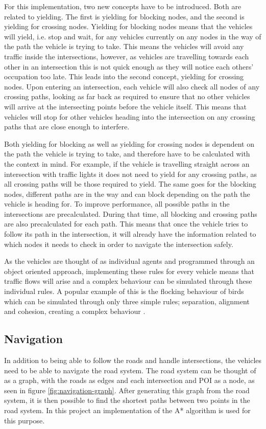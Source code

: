         For this implementation, two new concepts have to be introduced. Both are related to yielding. The first is yielding for blocking nodes, and the second is yielding for crossing nodes. Yielding for blocking nodes means that the vehicles will yield, i.e. stop and wait, for any vehicles currently on any nodes in the way of the path the vehicle is trying to take. This means the vehicles will avoid any traffic inside the intersections, however, as vehicles are travelling towards each other in an intersection this is not quick enough as they will notice each others' occupation too late. This leads into the second concept, yielding for crossing nodes. Upon entering an intersection, each vehicle will also check all nodes of any crossing paths, looking as far back as required to ensure that no other vehicles will arrive at the intersecting points before the vehicle itself. This means that vehicles will stop for other vehicles heading into the intersection on any crossing paths that are close enough to interfere.
    
        Both yielding for blocking as well as yielding for crossing nodes is dependent on the path the vehicle is trying to take, and therefore have to be calculated with the context in mind. For example, if the vehicle is travelling straight across an intersection with traffic lights it does not need to yield for any crossing paths, as all crossing paths will be those required to yield. The same goes for the blocking nodes, different paths are in the way and can block depending on the path the vehicle is heading for. To improve performance, all possible paths in the intersections are precalculated. During that time, all blocking and crossing paths are also precalculated for each path. This means that once the vehicle tries to follow its path in the intersection, it will already have the information related to which nodes it needs to check in order to navigate the intersection safely.
    
        As the vehicles are thought of as individual agents and programmed through an object oriented approach, implementing these rules for every vehicle means that traffic flows will arise and a complex behaviour can be simulated through these individual rules. A popular example of this is the flocking behaviour of birds which can be simulated through only three simple rules; separation, alignment and cohesion, creating a complex behaviour \cite{flocking-behaviour}.

    \subsection{Navigation}
        In addition to being able to follow the roads and handle intersections, the vehicles need to be able to navigate the road system. The road system can be thought of as a graph, with the roads as edges and each intersection and POI as a node, as seen in figure \ref{fig:navigation-graph}. After generating this graph from the road system, it is then possible to find the shortest paths between two points in the road system. In this project an implementation of the A* algorithm is used for this purpose.

